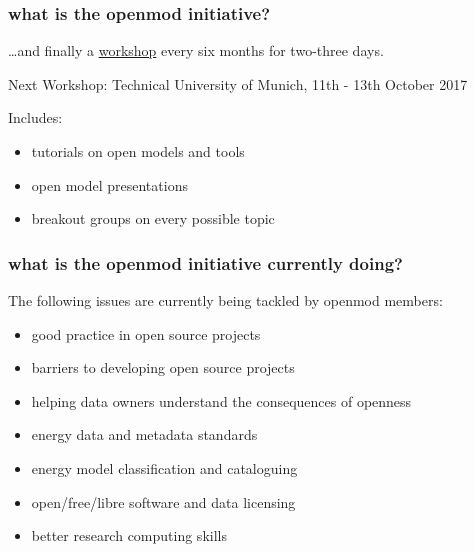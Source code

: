 \documentclass[12pt,aspectratio=169]{beamer}
\let\olditem\item
\renewcommand{\item}{%
\olditem\vspace{5pt}}
\begin{document}
\begin{frame}
  \frametitle{what is the openmod initiative?}

  \dots and finally a \alert{\href{https://wiki.openmod-initiative.org/wiki/Open_Energy_Modelling_Workshop_-_Munich_2017}{workshop}} every six months for two-three days.

  Next Workshop: Technical University of Munich, 11th - 13th October 2017

  Includes:

  \begin{itemize}
  \item  tutorials on open models and tools
  \item open model presentations
  \item breakout  groups on every possible topic
  \end{itemize}

\end{frame}


\begin{frame}
  \frametitle{what is the openmod initiative currently doing?}

  The following \alert{issues} are currently being tackled by
  openmod members:
  \begin{itemize}
  \item   good practice in open source projects
  \item barriers to developing open source projects
  \item helping data owners understand the consequences of openness
  \item energy data and metadata standards
  \item energy model classification and cataloguing
  \item open/free/libre software and data licensing
  \item    better research computing skills
  \end{itemize}
\end{frame}
\end{document}
